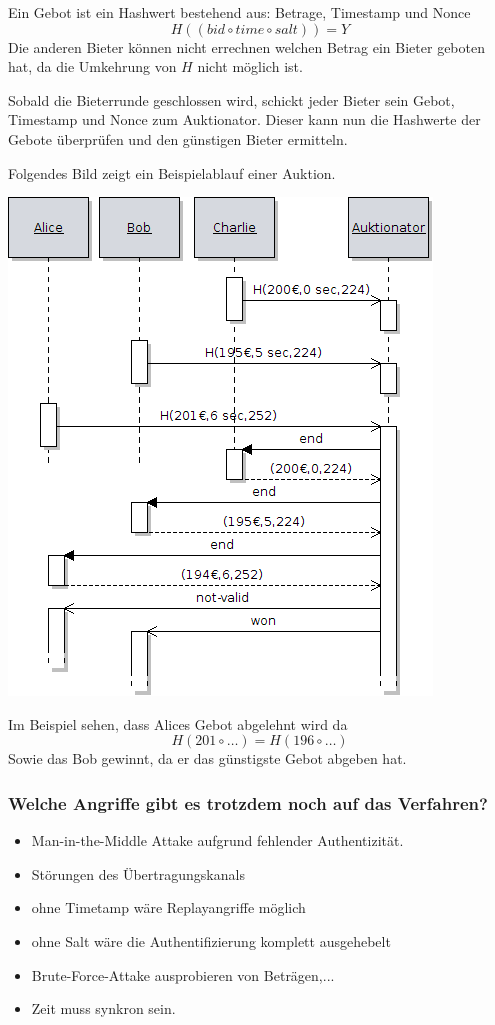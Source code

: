 Ein Gebot ist ein Hashwert bestehend aus: Betrage, Timestamp und Nonce $$H(( bid \circ time \circ salt) ) = Y$$
Die anderen Bieter können nicht errechnen welchen Betrag ein Bieter geboten hat,
da die Umkehrung von $H$ nicht möglich ist.

Sobald die Bieterrunde geschlossen wird, schickt jeder Bieter sein Gebot, Timestamp und Nonce zum Auktionator. 
Dieser kann nun die Hashwerte der Gebote überprüfen und den günstigen Bieter ermitteln.

Folgendes Bild zeigt ein Beispielablauf einer Auktion.

\begin{center}
\includegraphics[scale=0.5]{images/auction-bidding.png}
\end{center}

Im Beispiel sehen, dass Alices Gebot abgelehnt wird da $$H(  201 \circ \ldots  ) = H( 196 \circ \ldots)$$
Sowie das Bob gewinnt, da er das günstigste Gebot abgeben hat.

\subsubsection{Welche Angriffe gibt es trotzdem noch auf das Verfahren?}

\begin{itemize}
\item Man-in-the-Middle Attake aufgrund fehlender Authentizität.
\item Störungen des Übertragungskanals
\item ohne Timetamp wäre Replayangriffe möglich
\item ohne Salt wäre die Authentifizierung komplett ausgehebelt
\item Brute-Force-Attake ausprobieren von Beträgen,...
\item Zeit muss synkron sein.
\end{itemize}

